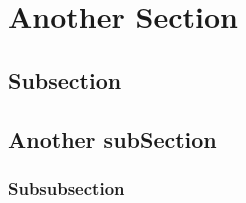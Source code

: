 \section{Another Section}
\blindtext
\par
\blindtext
\subsection{Subsection}
\blindtext
\subsection{Another subSection}
\blindtext
\par
\blindtext
\subsubsection{Subsubsection}
\blindtext
